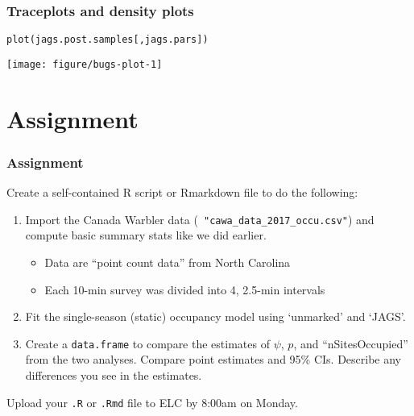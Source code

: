 \documentclass[color=usenames,dvipsnames,handout]{beamer}\usepackage[]{graphicx}\usepackage[]{xcolor}
\makeatletter
\newcommand{\hldef}[1]{\textcolor[rgb]{0,0,0}{#1}}%
\newcommand{\hlkwd}[1]{\textcolor[rgb]{0.004,0.004,0.506}{#1}}%
\newenvironment{kframe}{%
 \def\at@end@of@kframe{}%
 \ifinner\ifhmode%
  \def\at@end@of@kframe{\end{minipage}}%
  \begin{minipage}{\columnwidth}%
 \fi\fi%
 \def\FrameCommand##1{\hskip\@totalleftmargin \hskip-\fboxsep
 \colorbox{shadecolor}{##1}\hskip-\fboxsep
     \hskip-\linewidth \hskip-\@totalleftmargin \hskip\columnwidth}%
 \MakeFramed {\advance\hsize-\width
   \@totalleftmargin\z@ \linewidth\hsize
   \@setminipage}}%
 {\par\unskip\endMakeFramed%
 \at@end@of@kframe}
\newenvironment{knitrout}{}{} %
\newcommand{\inr}[1]{\colorbox{inlinecolor}{\texttt{#1}}}
\makeatother
\begin{document}
\begin{frame}[fragile]
  \frametitle{Traceplots and density plots}
\begin{knitrout}\footnotesize
{}\color{fgcolor}\begin{kframe}
\begin{alltt}
\hlkwd{plot}\hldef{(jags.post.samples[,jags.pars])}
\end{alltt}
\end{kframe}

{\centering \texttt{[image: figure/bugs-plot-1]} 

}


\end{knitrout}
\end{frame}


\section{Assignment}











\begin{frame}
  \frametitle{Assignment}
  \small
  Create a self-contained R script or Rmarkdown file
  to do the following:
  \begin{enumerate}
    \small
    \item Import the Canada Warbler data ({\tt
      "cawa\_data\_2017\_occu.csv"}) and compute basic summary  stats
      like we did earlier. 
    \begin{itemize}
      \item Data are ``point count data'' from North Carolina
      \item Each 10-min survey was divided into 4, 2.5-min intervals 
    \end{itemize}
    \item Fit the single-season (static) occupancy model using
      `unmarked' and `JAGS'. 
    \item Create a \inr{data.frame} to compare the estimates of
      $\psi$, $p$, and ``nSitesOccupied'' from the two
      analyses. Compare point estimates and 95\% CIs. Describe any
      differences you see in the estimates.
  \end{enumerate}
  Upload your {\tt .R} or {\tt .Rmd} file to ELC by 8:00am on Monday. 
\end{frame}
\end{document}

